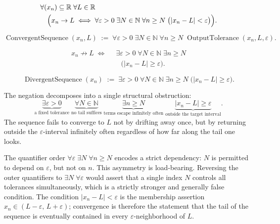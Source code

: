 \begin{remark*}
\[
\begin{aligned}
&\forall (x_n) \subseteq \mathbb{R} \;\forall L \in \mathbb{R}\\
&\quad\Bigl(
    x_n \to L
    \;\Longleftrightarrow\;
    \forall \varepsilon > 0 \;\exists N \in \mathbb{N} \;\forall n \ge N
    \;\bigl(|x_n - L| < \varepsilon\bigr)
\Bigr).
\end{aligned}
\]
\end{remark*}

\begin{remark*}
\[
\operatorname{ConvergentSequence}(x_n, L)
\;:=\;
\forall \varepsilon > 0 \;\exists N \in \mathbb{N} \;\forall n \ge N
\;\operatorname{OutputTolerance}(x_n, L, \varepsilon).
\]
\end{remark*}

\begin{remark*}
\[
\begin{aligned}
x_n \not\to L
\;\Longleftrightarrow\;
&\;\exists \varepsilon > 0 \;\forall N \in \mathbb{N} \;\exists n \ge N\\
&\quad\bigl(|x_n - L| \ge \varepsilon\bigr).
\end{aligned}
\]
\end{remark*}

\begin{remark*}
\[
\operatorname{DivergentSequence}(x_n)
\;:=\;
\exists \varepsilon > 0 \;\forall N \in \mathbb{N} \;\exists n \ge N
\;\bigl(|x_n - L| \ge \varepsilon\bigr).
\]
\end{remark*}

\begin{remark*}
The negation decomposes into a single structural obstruction:
\[
\underbrace{\exists \varepsilon > 0}_{\text{a fixed tolerance}}
\;\underbrace{\forall N \in \mathbb{N}}_{\text{no tail suffices}}
\;\underbrace{\exists n \ge N}_{\text{terms escape infinitely often}}
\;\underbrace{|x_n - L| \ge \varepsilon}_{\text{outside the target interval}}.
\]
The sequence fails to converge to $L$ not by drifting away once, but
by returning outside the $\varepsilon$-interval infinitely often regardless
of how far along the tail one looks.
\end{remark*}

\begin{remark*}[Interpretation]
The quantifier order $\forall \varepsilon \;\exists N \;\forall n \ge N$
encodes a strict dependency: $N$ is permitted to depend on $\varepsilon$,
but not on $n$. This asymmetry is load-bearing. Reversing the outer
quantifiers to $\exists N \;\forall \varepsilon$ would assert that a
single index $N$ controls all tolerances simultaneously, which is a
strictly stronger and generally false condition. The condition
$|x_n - L| < \varepsilon$ is the membership assertion $x_n \in (L -
\varepsilon,\, L + \varepsilon)$; convergence is therefore the statement
that the tail of the sequence is eventually contained in every
$\varepsilon$-neighborhood of $L$.
\end{remark*}

